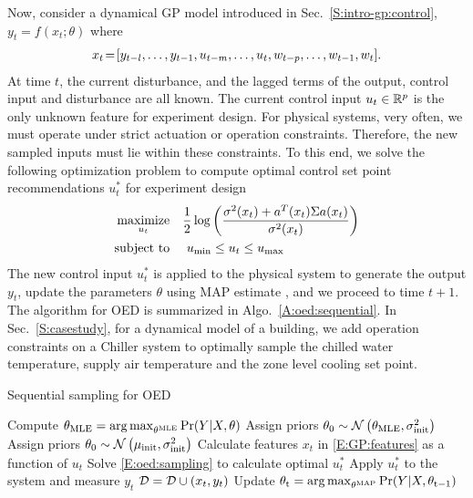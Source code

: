 Now, consider a dynamical GP model introduced in Sec.~\ref{S:intro-gp:control},
\begin{math}
y_{t} = f(x_t;\theta)
\end{math}
where
\begin{align}
x_{t}\!=\![y_{t-l}, \dots, y_{t-1}, u_{t-m}, \dots, u_t, w_{t-p}, \dots, w_{t-1}, w_t] \text.
\label{E:GP:features}
\end{align}
At time \(t\), the current disturbance, and the lagged terms of the output, control input and disturbance are all known. The current control input \(u_t \in \mathbb{R}^p \) is the only unknown feature for experiment design. For physical systems, very often, we must operate under strict actuation or operation constraints. Therefore, the new sampled inputs must lie within these constraints. To this end, we solve the following optimization problem to compute optimal control set point recommendations \(u^*_t\) for experiment design
\begin{align}
\label{E:oed:sampling}
\maximize_{u_{t}} & \ \ \ \frac{1}{2}\log\left(\frac{\sigma^2(x_t)+a^T(x_t)\Sigma a(x_t)}{\sigma^2(x_t)}\right) \\
\st &  \ \ \ \     u_{\mathrm{min}}  \leq u_t \leq u_{\mathrm{max}} \nonumber
\end{align}
The new control input \(u^*_t\) is applied to the physical system to generate the output \(y_t\), update the parameters \(\theta\) using MAP estimate \cite{Garnett2013}, and we proceed to time \(t+1\). 
The algorithm for OED is summarized in Algo.~\ref{A:oed:sequential}.
In Sec.~\ref{S:casestudy}, for a dynamical model of a building, we add operation constraints on a Chiller system to optimally sample the chilled water temperature, supply air temperature and the zone level cooling set point. 

\begin{algorithm}[!tb]
	\caption{Sequential sampling for OED}
	\label{A:oed:sequential}
	\begin{algorithmic}[1]
		\State Compute \( \theta_{\mathrm{MLE}} = \operatorname*{arg\,max}_{\theta^{\mathrm{MLE}}} \Pr(Y \vert X, \theta)\)
		\State Assign priors \(\theta_{\mathrm{0}} \sim \operatorname*{\mathcal{N}}\left(\theta_{\mathrm{MLE}}, \sigma^2_{\mathrm{init}}\right)\)
		\Else 
		\State Assign priors \(\theta_{\mathrm{0}} \sim \operatorname*{\mathcal{N}}\left(\mu_{\mathrm{{init}}}, \sigma^2_\mathrm{init}\right)\)
		\EndIf
		\EndProcedure
		\State Calculate features \(x_t\) in \eqref{E:GP:features} as a function of \(u_t\)
		\State Solve \eqref{E:oed:sampling} to calculate optimal \(u^*_t\)
		\State Apply \(u^*_t\) to the system and measure \(y_t\)
		\State \(\mathcal{D} = \mathcal{D} \cup (x_t,y_t) \)
		\State Update \( \theta_{\mathrm{t}} = \operatorname*{arg\,max}_{\theta^{\mathrm{MAP}}} \Pr(Y \vert X, \theta_{\mathrm{t-1}})\)
		\EndWhile
		\EndProcedure
	\end{algorithmic}
\end{algorithm}

